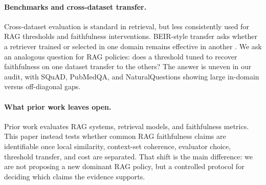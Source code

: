 \paragraph{Benchmarks and cross-dataset transfer.}
Cross-dataset evaluation is standard in retrieval, but less consistently used
for RAG thresholds and faithfulness interventions. BEIR-style transfer asks
whether a retriever trained or selected in one domain remains effective in
another \citep{thakur2021beir}. We ask an analogous question for RAG policies:
does a threshold tuned to recover faithfulness on one dataset transfer to the
others? The answer is uneven in our audit, with SQuAD, PubMedQA, and
NaturalQuestions showing large in-domain versus off-diagonal gaps.

\paragraph{What prior work leaves open.}
Prior work evaluates RAG systems, retrieval models, and faithfulness metrics.
This paper instead tests whether common RAG faithfulness claims are
identifiable once local similarity, context-set coherence, evaluator choice,
threshold transfer, and cost are separated. That shift is the main difference:
we are not proposing a new dominant RAG policy, but a controlled protocol for
deciding which claims the evidence supports.
